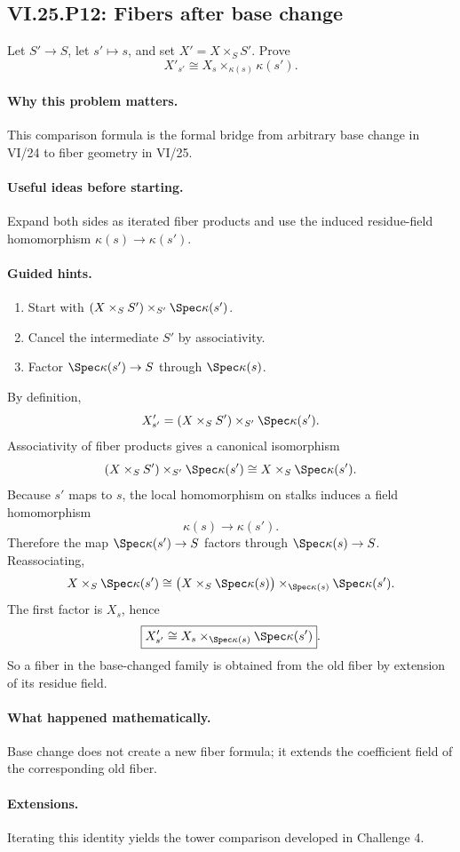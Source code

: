\subsection*{VI.25.P12: Fibers after base change}
\begin{problem}\label{prob:vi25-p12}
Let \(S'\to S\), let \(s'\mapsto s\), and set \(X'=X\times_SS'\). Prove
\[
X'_{s'}\cong X_s\times_{\kappa(s)}\kappa(s').
\]
\end{problem}

\ifdefined\FullProblemDossiers
\paragraph{Why this problem matters.}
This comparison formula is the formal bridge from arbitrary base change in VI/24 to fiber geometry in VI/25.

\paragraph{Useful ideas before starting.}
Expand both sides as iterated fiber products and use the induced residue-field homomorphism \(\kappa(s)\to\kappa(s')\).

\paragraph{Guided hints.}
\begin{enumerate}
\item Start with \((X\times_SS')\times_{S'}\Spec\kappa(s')\).
\item Cancel the intermediate \(S'\) by associativity.
\item Factor \(\Spec\kappa(s')\to S\) through \(\Spec\kappa(s)\).
\end{enumerate}

\begin{solution}
By definition,
\[
X'_{s'}
=
(X\times_SS')\times_{S'}\Spec\kappa(s').
\]
Associativity of fiber products gives a canonical isomorphism
\[
(X\times_SS')\times_{S'}\Spec\kappa(s')
\cong
X\times_S\Spec\kappa(s').
\]
Because \(s'\) maps to \(s\), the local homomorphism on stalks induces a field homomorphism
\[
\kappa(s)\longrightarrow\kappa(s').
\]
Therefore the map \(\Spec\kappa(s')\to S\) factors through \(\Spec\kappa(s)\to S\).  Reassociating,
\[
X\times_S\Spec\kappa(s')
\cong
\bigl(X\times_S\Spec\kappa(s)\bigr)
\times_{\Spec\kappa(s)}
\Spec\kappa(s').
\]
The first factor is \(X_s\), hence
\[
\boxed{
X'_{s'}
\cong
X_s\times_{\Spec\kappa(s)}\Spec\kappa(s')
}.
\]
So a fiber in the base-changed family is obtained from the old fiber by extension of its residue field.
\end{solution}

\paragraph{What happened mathematically.}
Base change does not create a new fiber formula; it extends the coefficient field of the corresponding old fiber.

\paragraph{Extensions.}
Iterating this identity yields the tower comparison developed in Challenge 4.
\fi
